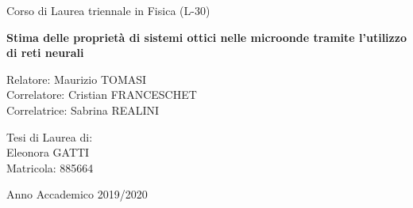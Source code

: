 \documentclass[11pt,a4paper,twoside,
openright]{book}
\begin{document}
\begin{titlepage}
  
  

\begin{center}
{\LARGE Corso di Laurea triennale in Fisica (L-30)}
\end{center}

\vspace{1 cm}
\begin{figure}[h]
    \end{figure}

\begin{center}
\vspace{3 cm}

{\huge \textbf{Stima delle proprietà di sistemi ottici nelle microonde tramite l'utilizzo di reti neurali} }



\end{center}
\par
  \vspace{3 cm}
  
  \begin{flushleft}
       Relatore: Maurizio TOMASI \\
     
       \noindent Correlatore: Cristian FRANCESCHET \\
       \noindent Correlatrice: Sabrina REALINI
  \end{flushleft}
  \vspace{1 cm}
  \begin{flushright}
    Tesi di Laurea di:\\ Eleonora GATTI\\ Matricola: 885664
  \end{flushright}
        
\vfill
\begin{center}
  {\large Anno Accademico 2019/2020}
\end{center}
\end{titlepage}
\end{document}
